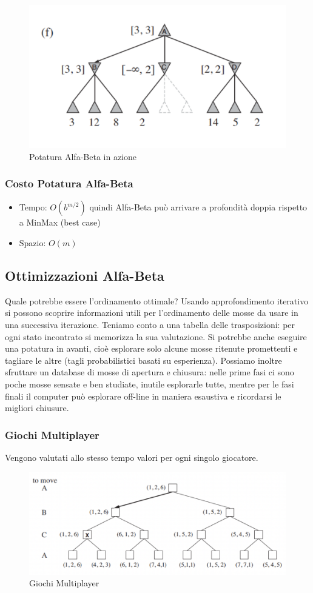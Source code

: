 \documentclass{article}
\begin{document}
\begin{figure}[h!]
\includegraphics[scale=0.2]{Images/alfabetaaction5.png}
\caption{Potatura Alfa-Beta in azione}
\end{figure}
\subsubsection{Costo Potatura Alfa-Beta}
\begin{itemize}
    \item Tempo: $O(b^{m/2})$ quindi Alfa-Beta può arrivare a profondità doppia rispetto a MinMax (best case)
    \item Spazio: $O(m)$
\end{itemize}
\subsection{Ottimizzazioni Alfa-Beta}
Quale potrebbe essere l'ordinamento ottimale? Usando approfondimento iterativo si possono scoprire informazioni utili per l’ordinamento delle mosse da usare in una successiva iterazione. Teniamo conto a una  tabella delle trasposizioni: per ogni stato incontrato si memorizza la sua valutazione.
Si potrebbe anche eseguire una potatura in avanti, cioè esplorare solo alcune mosse ritenute promettenti e tagliare le altre (tagli probabilistici basati su esperienza). Possiamo inoltre sfruttare un database di mosse di apertura e chiusura: nelle prime fasi ci sono poche mosse sensate e ben studiate, inutile esplorarle tutte, mentre per le fasi finali il computer può esplorare off-line in maniera esaustiva e ricordarsi le migliori chiusure.
\subsubsection{Giochi Multiplayer}
Vengono valutati allo stesso tempo valori per ogni singolo giocatore.
\begin{figure}[h!]
\centering
\includegraphics[scale=0.3]{Images/giochimultiplayer.png}
\caption{Giochi Multiplayer}
\end{figure}
\end{document}
